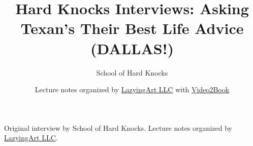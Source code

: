 \documentclass[11pt,oneside]{book}
\begin{document}
\frontmatter
\title{Hard Knocks Interviews: Asking Texan's Their Best Life Advice (DALLAS!)}
\author{School of Hard Knocks}
\date{Lecture notes organized by \href{https://lazying.art}{LazyingArt LLC} with \href{https://github.com/lachlanchen/Video2Book}{Video2Book}}
\maketitle
\begin{center}
\small Original interview by School of Hard Knocks. Lecture notes organized by \href{https://lazying.art}{LazyingArt LLC}.
\end{center}
\clearpage
\mainmatter

\end{document}
